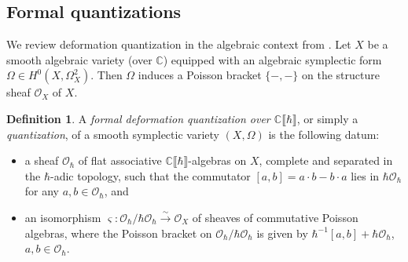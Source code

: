 \documentclass[11pt, a4paper]{amsart}
\newcommand{\C}{\mathbb{C}}
\newcommand{\Z}{\mathbb{Z}}
\newcommand{\gr}{\operatorname{gr}}
\newcommand{\cA}{\mathcal{A}}
\newcommand{\hb}{\hbar}
\newcommand{\series}{\llbracket \hb \rrbracket}
\newcommand{\cm}{\C^\times}
\newcommand{\OO}{\mathcal{O}}
\newcommand{\Dcal}{\mathcal{D}}
\theoremstyle{definition}
\newtheorem{defi}[Thm]{Definition}
\numberwithin{equation}{section}
\begin{document}
\subsection{Formal quantizations}
\label{subsec:formal_quant}

We review deformation quantization in the algebraic context from \cite{BeKaledin}. Let $X$ be a smooth algebraic variety (over $\C$) equipped with an algebraic symplectic form $\Omega \in H^0(X, \Omega_X^2)$. Then $\Omega$ induces a Poisson bracket $\{ - , -\}$ on the structure sheaf $\OO_X$ of $X$.

\begin{defi}\label{defn:formal_quan}
A \emph{formal deformation quantization over $\C\series$}, or simply a {\it quantization}, of a smooth symplectic variety $(X, \Omega)$ is the following datum:
\begin{itemize}
	\item
		a sheaf $\OO_\hb$ of flat associative $\C\series$-algebras on $X$, complete and separated in the $\hb$-adic topology, such that the commutator $[a, b] = a \cdot b - b \cdot a$ lies in $\hb \OO_\hb$ for any $a, b \in \OO_\hb$, and
	\item
		an isomorphism $\varsigma: \OO_\hb / \hb \OO_\hb \xrightarrow{\sim} \OO_X$ of sheaves of commutative Poisson algebras, where the Poisson bracket on $\OO_\hb / \hb \OO_\hb$ is given by $\hb^{-1}[a, b] + \hb \OO_\hb$, $a, b \in \OO_\hb$.
\end{itemize}
\end{defi}
\end{document}
